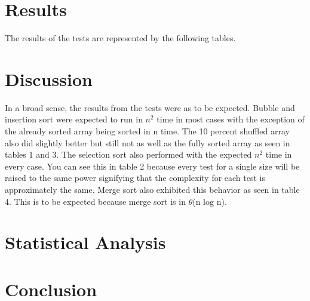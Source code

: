 \documentclass[12pt]{report}
\begin{document}
\section*{Results}
The results of the tests are represented by the following tables.
\newpage

\section*{Discussion}
	In a broad sense, the results from the tests were as to be expected.
	Bubble and insertion sort were expected to run in $n^2$ time in most
	cases with the exception of the already sorted array being sorted
	in n time. The 10 percent shuffled array also did slightly better but
	still not as well as the fully sorted array as seen in tables 1 and 3. 
	The selection sort also performed with the expected $n^2$ time in every 
	case. You can see this in table 2 because every test for a single 
	size will be raised to the same power signifying that the complexity
	for each test is approximately the same. Merge sort also exhibited
	this behavior as seen in table 4. This is to be expected because merge
	sort is in $\theta$(n log n).


\section*{Statistical Analysis}

\section*{Conclusion}
\end{document}
